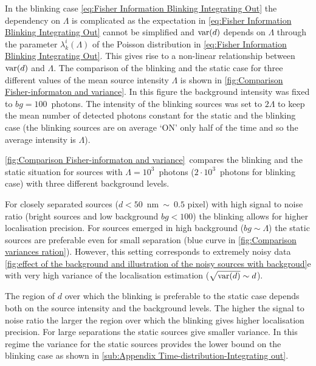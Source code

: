 In the blinking case \autoref{eq:Fisher Information Blinking Integrating Out} the dependency on $\Lambda$ is complicated as the expectation in \autoref{eq:Fisher Information Blinking Integrating Out} cannot be simplified and $\mathrm{var}(d)$ depends on $\Lambda$ through the parameter $\lambda_k^i(\Lambda)$ of the Poisson distribution in \autoref{eq:Fisher Information Blinking Integrating Out}. This gives rise to a non-linear relationship between $\mathrm{var}(d)$ and $\Lambda$.
%
The comparison of the blinking and the static case for three different values of the mean source intensity $\Lambda$ is shown in \autoref{fig:Comparison Fisher-informaton and variance}\aaa. In this figure the background intensity was fixed to $bg=100$~photons. The intensity of the blinking sources was set to $2\Lambda$ to keep the mean number of detected photons constant for the static and the blinking case (the blinking sources are on average `ON' only half of the time and so the average intensity is $\Lambda$). 



\autoref{fig:Comparison Fisher-informaton and variance}\bbb\ compares the blinking and the static situation for sources with $\Lambda=10^3$~photons ($2\cdot10^3$~photons for blinking case) with three different background levels.

For closely separated sources ($d<50$~nm$\ \sim\ 0.5$ pixel) with high signal to noise ratio (bright sources and low background $bg<100$) the blinking allows for higher localisation precision. For sources emerged in high background ($bg\sim\Lambda$) the static sources are preferable even for small separation (blue curve in \autoref{fig:Comparison variances ration}). However, this setting corresponds to extremely noisy data \autoref{fig:effect of the background and illustration of the noisy sources with backgroud}e with very high variance of the localisation estimation ($\sqrt{\mathrm{var}(d)}\sim d$). 

The region of $d$ over which the blinking is preferable to the static case depends both on the source intensity and the background levels. The higher the signal to noise ratio the larger the region over which the blinking gives higher localisation precision. For large separations the static sources give smaller variance. In this regime the variance for the static sources provides the lower bound on the blinking case as shown in \autoref{sub:Appendix Time-distribution-Integrating out}.

